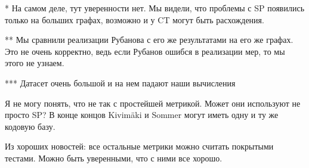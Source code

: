 \documentclass{article}
\begin{document}
{
\small
* На самом деле, тут уверенности нет. Мы видели, что проблемы с SP появились только на больших графах, возможно и у CT могут быть расхождения.

** Мы сравнили реализации Рубанова с его же результатами на его же графах. Это не очень корректно, ведь если Рубанов ошибся в реализации мер, то мы этого не узнаем.

*** Датасет очень большой и на нем падают наши вычисления
}

\medskip

Я не могу понять, что не так с простейшей метрикой. Может они используют не просто SP? В конце концов Kivim{\"a}ki и Sommer могут иметь одну и ту же кодовую базу.

Из хороших новостей: все остальные метрики можно считать покрытыми тестами. Можно быть уверенными, что с ними все хорошо.
\end{document}
